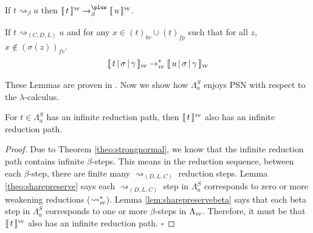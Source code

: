 \documentclass[runningheads]{llncs}
\let\vec\relax
\newcommand{\FALC}{\Lambda^{S}_{a}}
\newcommand{\WEAK}{\Lambda_{\weaksymbol}}
\newcommand{\fv}[1]{(#1)_{fv}}
\newcommand{\bv}[1]{(#1)_{bv}}
\newcommand{\fp}[1]{(#1)_{fp}}
\newcommand{\share}[3]{#1 [#2 \leftarrow #3]}
\newcommand{\compile}[1]{\llparenthesis \, #1 \, \rrparenthesis}
\newcommand{\weaksymbol}{\mbox{\tiny $\mathcal{W}$}}
\newcommand{\readweakwmap}[3]{\llbracket \, #1 \, \vert \, #2 \, \vert \, #3  \, \rrbracket_{\weaksymbol} }
\newcommand{\compweak}[1]{\llparenthesis \, #1 \, \rrparenthesis^{\weaksymbol}}
\newcommand{\composeweak}[1]{\llbracket \, #1 \, \rrbracket^{\weaksymbol}}
\newcommand*{\QEDB}{\hfill\ensuremath{\square}}
\begin{document}

\begin{lemma}
\label{lem:sharepreservebeta}
	If $t \rightsquigarrow_{\beta} u$ then $\composeweak{t} \rightarrow^{\plus}_{\beta} \composeweak{u}$.
\end{lemma}

\begin{lemma}
\label{theo:sharepreserve}
	If $t \rightsquigarrow_{(C, D, L)} u$ and for any $x \in \bv{t} \cup \fp{t}$ such that for all $z$, $x \not\in \fv{\sigma(z)}$.  $$\readweakwmap{t}{\sigma}{\gamma} \rightarrow^{*}_{\weaksymbol} \readweakwmap{u}{\sigma}{\gamma}$$

\end{lemma}

These Lemmas are proven in \cite[pp.~82-86]{sherratt2019atomic}. Now we show how $\FALC$ enjoys PSN with respect to the $\lambda$-calculus. 


\begin{lemma}
\label{lem:infinitepath}
For $t \in \FALC$ has an infinite reduction path, then $\composeweak{t}$ also has an infinite reduction path.
\end{lemma}

\begin{proof}
Due to Theorem \ref{theo:strongnormal}, we know that the infinite reduction path contains infinite $\beta$-steps. This means in the reduction sequence, between each $\beta$-step, there are finite many $\rightsquigarrow_{(D, L, C)}$ reduction steps. Lemma \ref{theo:sharepreserve} says each $\rightsquigarrow_{(D, L, C)}$ step in $\FALC$ corresponds to zero or more weakening reductions ($\rightsquigarrow^{*}_{\weaksymbol}$). Lemma \ref{lem:sharepreservebeta} says that each beta step in $\FALC$ corresponds to one or more $\beta$-steps in $\WEAK$. Therefore, it must be that $\composeweak{t}$ also has an infinite reduction path. \QEDB
\end{proof}
\end{document}
